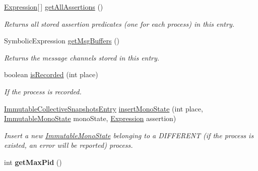 \begin{DoxyCompactItemize}
\hyperlink{interfaceedu_1_1udel_1_1cis_1_1vsl_1_1civl_1_1model_1_1IF_1_1expression_1_1Expression}{Expression}\mbox{[}$\,$\mbox{]} \hyperlink{classedu_1_1udel_1_1cis_1_1vsl_1_1civl_1_1state_1_1common_1_1immutable_1_1ImmutableCollectiveSnapshotsEntry_a0b6c8686d4626dc545a7b09c20ab89b6}{get\+All\+Assertions} ()
\begin{DoxyCompactList}\small\item\em Returns all stored assertion predicates (one for each process) in this entry. \end{DoxyCompactList}\item 
Symbolic\+Expression \hyperlink{classedu_1_1udel_1_1cis_1_1vsl_1_1civl_1_1state_1_1common_1_1immutable_1_1ImmutableCollectiveSnapshotsEntry_a7c29ffb4b29955e864a2633903bc68b8}{get\+Msg\+Buffers} ()
\begin{DoxyCompactList}\small\item\em Returns the message channels stored in this entry. \end{DoxyCompactList}\item 
boolean \hyperlink{classedu_1_1udel_1_1cis_1_1vsl_1_1civl_1_1state_1_1common_1_1immutable_1_1ImmutableCollectiveSnapshotsEntry_a95893a825bcf6ffb7786033f45e47d62}{is\+Recorded} (int place)
\begin{DoxyCompactList}\small\item\em If the process is recorded. \end{DoxyCompactList}\item 
\hyperlink{classedu_1_1udel_1_1cis_1_1vsl_1_1civl_1_1state_1_1common_1_1immutable_1_1ImmutableCollectiveSnapshotsEntry}{Immutable\+Collective\+Snapshots\+Entry} \hyperlink{classedu_1_1udel_1_1cis_1_1vsl_1_1civl_1_1state_1_1common_1_1immutable_1_1ImmutableCollectiveSnapshotsEntry_a5655fbc939132a821d75c6865ddbea25}{insert\+Mono\+State} (int place, \hyperlink{classedu_1_1udel_1_1cis_1_1vsl_1_1civl_1_1state_1_1common_1_1immutable_1_1ImmutableMonoState}{Immutable\+Mono\+State} mono\+State, \hyperlink{interfaceedu_1_1udel_1_1cis_1_1vsl_1_1civl_1_1model_1_1IF_1_1expression_1_1Expression}{Expression} assertion)
\begin{DoxyCompactList}\small\item\em Insert a new \hyperlink{classedu_1_1udel_1_1cis_1_1vsl_1_1civl_1_1state_1_1common_1_1immutable_1_1ImmutableMonoState}{Immutable\+Mono\+State} belonging to a D\+I\+F\+F\+E\+R\+E\+N\+T (if the process is existed, an error will be reported) process. \end{DoxyCompactList}\item 
\hypertarget{classedu_1_1udel_1_1cis_1_1vsl_1_1civl_1_1state_1_1common_1_1immutable_1_1ImmutableCollectiveSnapshotsEntry_a548aea3a288455a027525a83a500267a}{}int {\bfseries get\+Max\+Pid} ()\label{classedu_1_1udel_1_1cis_1_1vsl_1_1civl_1_1state_1_1common_1_1immutable_1_1ImmutableCollectiveSnapshotsEntry_a548aea3a288455a027525a83a500267a}


\end{DoxyCompactItemize}
